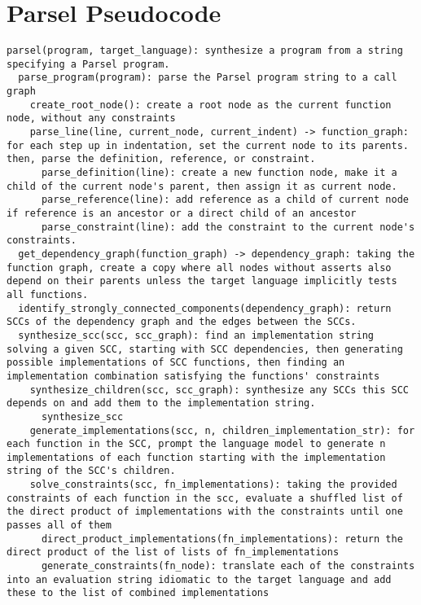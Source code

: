 \section{Parsel Pseudocode}
\begin{figure*}[t]
\vspace{-10px}
\begin{lstlisting}[basicstyle=\fontsize{6}{7.5}\selectfont\ttfamily]
parsel(program, target_language): synthesize a program from a string specifying a Parsel program.
  parse_program(program): parse the Parsel program string to a call graph
    create_root_node(): create a root node as the current function node, without any constraints
    parse_line(line, current_node, current_indent) -> function_graph: for each step up in indentation, set the current node to its parents. then, parse the definition, reference, or constraint.
      parse_definition(line): create a new function node, make it a child of the current node's parent, then assign it as current node.
      parse_reference(line): add reference as a child of current node if reference is an ancestor or a direct child of an ancestor
      parse_constraint(line): add the constraint to the current node's constraints.
  get_dependency_graph(function_graph) -> dependency_graph: taking the function graph, create a copy where all nodes without asserts also depend on their parents unless the target language implicitly tests all functions.
  identify_strongly_connected_components(dependency_graph): return SCCs of the dependency graph and the edges between the SCCs.
  synthesize_scc(scc, scc_graph): find an implementation string solving a given SCC, starting with SCC dependencies, then generating possible implementations of SCC functions, then finding an implementation combination satisfying the functions' constraints
    synthesize_children(scc, scc_graph): synthesize any SCCs this SCC depends on and add them to the implementation string.
      synthesize_scc
    generate_implementations(scc, n, children_implementation_str): for each function in the SCC, prompt the language model to generate n implementations of each function starting with the implementation string of the SCC's children.
    solve_constraints(scc, fn_implementations): taking the provided constraints of each function in the scc, evaluate a shuffled list of the direct product of implementations with the constraints until one passes all of them
      direct_product_implementations(fn_implementations): return the direct product of the list of lists of fn_implementations
      generate_constraints(fn_node): translate each of the constraints into an evaluation string idiomatic to the target language and add these to the list of combined implementations

\end{lstlisting}
\end{figure*}

